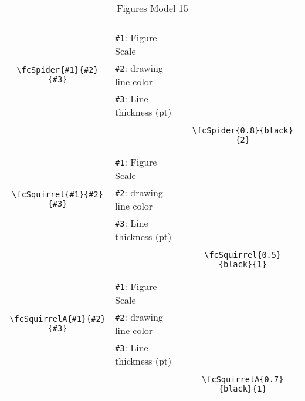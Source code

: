 \documentclass{article}
\begin{document}
\begin{table}[H]
\begin{tabular}{|c|l|c|}
	&&\multirow{5}{*}{\fcSpider{0.8}{black}{2}}\\	&&\\	&\verb|#1|: Figure Scale &\\	\verb|\fcSpider{#1}{#2}{#3}|&	\verb|#2|: drawing line color &\\	&\verb|#3|: Line thickness (pt) &\\ &&\\&&	\verb|\fcSpider{0.8}{black}{2}|\\\hline 	
	&&\multirow{5}{*}{\fcSquirrel{0.5}{black}{1}}\\	&&\\	&\verb|#1|: Figure Scale &\\	\verb|\fcSquirrel{#1}{#2}{#3}|&	\verb|#2|: drawing line color &\\	&\verb|#3|: Line thickness (pt) &\\ &&\\&&	\verb|\fcSquirrel{0.5}{black}{1}|\\\hline 	
	&&\multirow{5}{*}{\fcSquirrelA{0.7}{black}{1}}\\	&&\\	&\verb|#1|: Figure Scale &\\	\verb|\fcSquirrelA{#1}{#2}{#3}|&	\verb|#2|: drawing line color &\\	&\verb|#3|: Line thickness (pt) &\\ &&\\&&	\verb|\fcSquirrelA{0.7}{black}{1}|\\\hline 	\hline\end{tabular}\caption{Figures Model 15}\label{tab15}\end{table}
\end{document}
